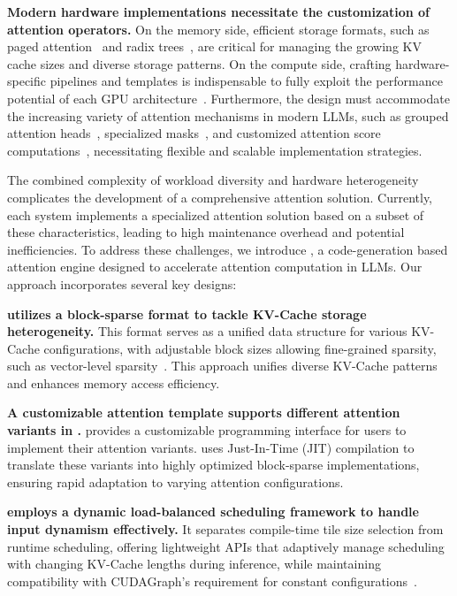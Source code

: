 \textbf{Modern hardware implementations necessitate the customization of attention operators.} On the memory side, efficient storage formats, such as paged attention~\cite{kwon2023vllm} and radix trees~\cite{zheng2023sglang}, are critical for managing the growing KV cache sizes and diverse storage patterns. On the compute side, crafting hardware-specific pipelines and templates is indispensable to fully exploit the performance potential of each GPU architecture~\cite{dao2023flashattention2,jay2024flashattention3}. Furthermore, the design must accommodate the increasing variety of attention mechanisms in modern LLMs, such as grouped attention heads~\cite{ainslie2023gqa, shazeer2019mqa}, specialized masks~\cite{beltagy020longformer}, and customized attention score computations~\cite{morgane2024gemma2,grok,jason2024flashsigmoid}, necessitating flexible and scalable implementation strategies.

The combined complexity of workload diversity and hardware heterogeneity complicates the development of a comprehensive attention solution. Currently, each system implements a specialized attention solution based on a subset of these characteristics, leading to high maintenance overhead and potential inefficiencies. To address these challenges, we introduce \sys, a code-generation based attention engine designed to accelerate attention computation in LLMs. Our approach incorporates several key designs:

\textbf{\sys utilizes a block-sparse format to tackle KV-Cache storage heterogeneity.} This format serves as a unified data structure for various KV-Cache configurations, with adjustable block sizes allowing fine-grained sparsity, such as vector-level sparsity~\cite{chen2021tensorcoressparsity, li2022magicube}. This approach unifies diverse KV-Cache patterns and enhances memory access efficiency.

\textbf{A customizable attention template supports different attention variants in \sys.} \sys provides a customizable programming interface for users to implement their attention variants. \sys uses Just-In-Time (JIT) compilation to translate these variants into highly optimized block-sparse implementations, ensuring rapid adaptation to varying attention configurations.

\textbf{\sys employs a dynamic load-balanced scheduling framework to handle input dynamism effectively.} It separates compile-time tile size selection from runtime scheduling, offering lightweight APIs that adaptively manage scheduling with changing KV-Cache lengths during inference, while maintaining compatibility with CUDAGraph's requirement for constant configurations~\cite{alan2019cudagraph, vinh2021pytorchcudagraph}.

